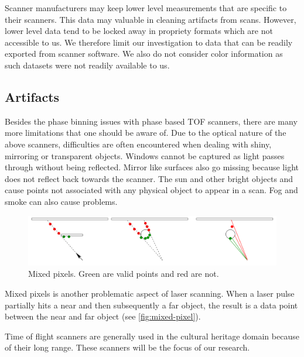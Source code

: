 Scanner manufacturers may keep lower level measurements that are specific to their scanners. This data may valuable in cleaning artifacts from scans. However, lower level data tend to be locked away in propriety formats which are not accessible to us. We therefore limit our investigation to data that can be readily exported from scanner software. We also do not consider color information as such datasets were not readily available to us.


\subsection{Artifacts}

Besides the phase binning issues with phase based TOF scanners, there are many more limitations that one should be aware of. Due to the optical nature of the above scanners, difficulties are often encountered when dealing with shiny, mirroring or transparent objects. Windows cannot be captured as light passes through without being reflected. Mirror like surfaces also go missing because light does not reflect back towards the scanner. The sun and other bright objects and cause points not associated with any physical object to appear in a scan. Fog and smoke can also cause problems.

\begin{figure}[ht]
  \centering
  \includegraphics[width=1\linewidth]{images/mixed-pixel}
  \caption{Mixed pixels. Green are valid points and red are not. \cite{Tuley2005}}
  \label{fig:mixed-pixel}
\end{figure}

Mixed pixels is another problematic aspect of laser scanning. When a laser pulse partially hits a near and then subsequently a far object, the result is a data point between the near and far object \cite{Tuley2005} (see \autoref{fig:mixed-pixel}).


\pagebreak


Time of flight scanners are generally used in the cultural heritage domain because of their long range. These scanners will be the focus of our research.


